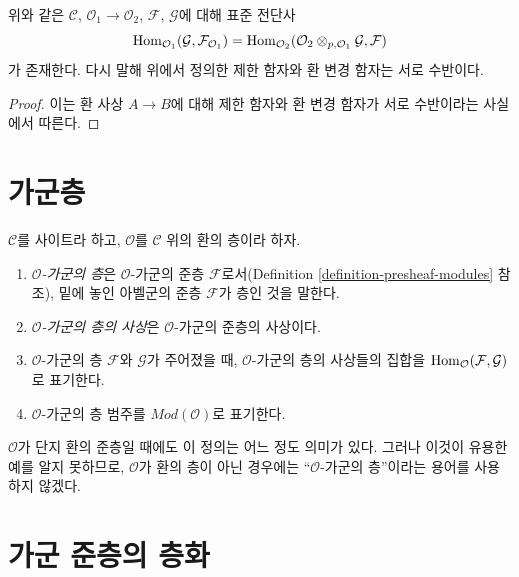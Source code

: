 \begin{lemma}
\label{lemma-adjointness-tensor-restrict-presheaves}
위와 같은 $\mathcal{C}$, $\mathcal{O}_1 \to \mathcal{O}_2$,
$\mathcal{F}$, $\mathcal{G}$에 대해 표준 전단사
$$
\mathop{\mathrm{Hom}}\nolimits_{\mathcal{O}_1}(\mathcal{G}, \mathcal{F}_{\mathcal{O}_1})
=
\mathop{\mathrm{Hom}}\nolimits_{\mathcal{O}_2}(
\mathcal{O}_2 \otimes_{p, \mathcal{O}_1} \mathcal{G},
\mathcal{F}
)
$$
가 존재한다. 다시 말해 위에서 정의한 제한 함자와 환 변경 함자는 서로 수반이다.
\end{lemma}

\begin{proof}
이는 환 사상 $A \to B$에 대해 제한 함자와 환 변경 함자가 서로 수반이라는
사실에서 따른다.
\end{proof}


\section{가군층}
\label{section-sheaves-modules}

\begin{definition}
\label{definition-sheaf-modules}
$\mathcal{C}$를 사이트라 하고, $\mathcal{O}$를 $\mathcal{C}$ 위의 환의
층이라 하자.
\begin{enumerate}
\item {\it $\mathcal{O}$-가군의 층}은 $\mathcal{O}$-가군의 준층
$\mathcal{F}$로서(Definition \ref{definition-presheaf-modules} 참조), 밑에 놓인
아벨군의 준층 $\mathcal{F}$가 층인 것을 말한다.
\item {\it $\mathcal{O}$-가군의 층의 사상}은 $\mathcal{O}$-가군의 준층의
사상이다.
\item $\mathcal{O}$-가군의 층 $\mathcal{F}$와 $\mathcal{G}$가 주어졌을 때,
$\mathcal{O}$-가군의 층의 사상들의 집합을
$\mathop{\mathrm{Hom}}\nolimits_\mathcal{O}(\mathcal{F}, \mathcal{G})$로 표기한다.
\item $\mathcal{O}$-가군의 층 범주를 $\textit{Mod}(\mathcal{O})$로 표기한다.
\end{enumerate}
\end{definition}

\noindent
$\mathcal{O}$가 단지 환의 준층일 때에도 이 정의는 어느 정도 의미가 있다.
그러나 이것이 유용한 예를 알지 못하므로, $\mathcal{O}$가 환의 층이 아닌
경우에는 ``$\mathcal{O}$-가군의 층''이라는 용어를 사용하지 않겠다.



\section{가군 준층의 층화}
\label{section-sheafification-presheaves-modules}

